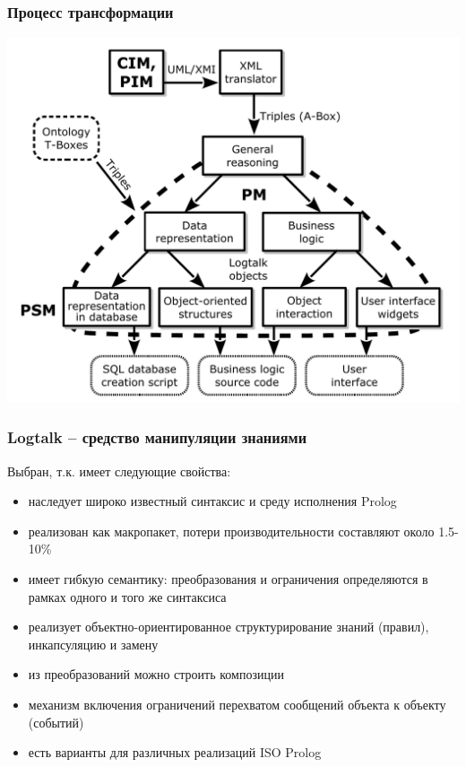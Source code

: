 \documentclass[10pt]{beamer}
\begin{document}
\begin{frame}
  \frametitle{Процесс трансформации}
  \centering
  \includegraphics[width=0.9\linewidth]{architect_tree_pres-en-wo-OCL.pdf}
\end{frame}

\begin{frame}
  \frametitle{Logtalk -- средство манипуляции знаниями}
  Выбран, т.к. имеет следующие свойства:
  \begin{itemize}
  \item наследует широко известный синтаксис и среду исполнения Prolog
  \item реализован как макропакет, потери производительности составляют около 1.5-10\%
  \item имеет гибкую семантику: преобразования и ограничения определяются в рамках одного и того же синтаксиса
  \item реализует объектно-ориентированное структурирование знаний (правил), инкапсуляцию и замену
  \item из преобразований можно строить композиции
  \item механизм включения ограничений перехватом сообщений объекта к объекту (событий)
  \item есть варианты для различных реализаций ISO Prolog
  \end{itemize}
\end{frame}
\end{document}
